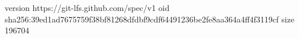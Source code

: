 version https://git-lfs.github.com/spec/v1
oid sha256:39ed1ad7675759f38bf81268dfdbf9cdf64491236be2fe8aa364a4ff4f3119cf
size 196704
